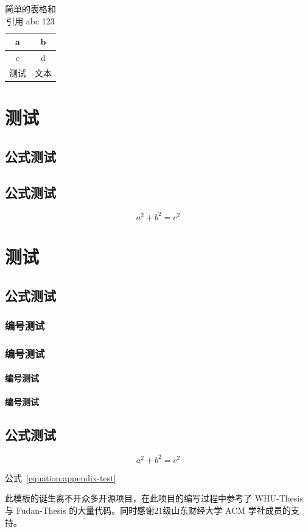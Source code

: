 \documentclass{sdufe-thesis}
\begin{document}
\begin{table}[ht]
  \centering
  \caption{%
    简单的表格和引用 abc 123 \cite{whu-bachelor:1}
  }
  \label{table:简单的表格}
  \begin{tabular}{cc}
    \hline
    a & b \\ \hline
    c & d \\ \hline
    测试 & 文本 \\ \hline
  \end{tabular}
\end{table}



\appendix

\chapter{测试}

\section{公式测试}
\section{公式测试}

\begin{equation}
  a^2 + b^2 = c^2
\end{equation}

\chapter{测试}

\section{公式测试}
\subsection{编号测试}
\subsection{编号测试}
\subsubsection{编号测试}
\subsubsection{编号测试}

\section{公式测试}

\begin{equation}\label{equation:appendix-test}
  a^2 + b^2 = c^2
\end{equation}

公式~\eqref{equation:appendix-test}


\begin{acknowledgements}
此模板的诞生离不开众多开源项目，在此项目的编写过程中参考了 WHU-Thesis 与 Fudan-Thesis 的大量代码。同时感谢21级山东财经大学 ACM 学社成员的支持。
\end{acknowledgements}
\end{document}
